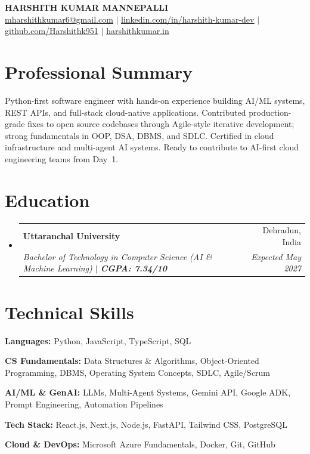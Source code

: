 \documentclass[letterpaper,10pt]{article}
\makeatletter
\newcommand{\resumeSubheading}[4]{
  \vspace{-2pt}\item
    \begin{tabular*}{0.97\textwidth}[t]{l@{\extracolsep{\fill}}r}
      \textbf{#1} & #2 \\
      \textit{\small#3} & \textit{\small #4} \\
    \end{tabular*}\vspace{-5pt}
}
\newcommand{\resumeSubHeadingListStart}{\begin{itemize}[leftmargin=0.15in, label={}]}
\newcommand{\resumeSubHeadingListEnd}{\end{itemize}}
\makeatother
\begin{document}
\begin{center}
    \textbf{\Huge \scshape HARSHITH KUMAR MANNEPALLI} \\ \vspace{3pt}
    \small
    \href{mailto:mharshithkumar6@gmail.com}{\underline{mharshithkumar6@gmail.com}} $|$
    \href{https://www.linkedin.com/in/harshith-kumar-dev/}{\underline{linkedin.com/in/harshith-kumar-dev}} $|$
    \href{https://github.com/Harshithk951}{\underline{github.com/Harshithk951}} $|$
    \href{https://harshithkumar.in}{\underline{harshithkumar.in}}
\end{center}

\section{Professional Summary}
\vspace{2pt}
\small{
Python-first software engineer with hands-on experience building AI/ML systems, REST APIs, and full-stack cloud-native applications. Contributed production-grade fixes to open source codebases through Agile-style iterative development; strong fundamentals in OOP, DSA, DBMS, and SDLC. Certified in cloud infrastructure and multi-agent AI systems. Ready to contribute to AI-first cloud engineering teams from Day~1.
}

\section{Education}
  \resumeSubHeadingListStart
    \resumeSubheading
      {Uttaranchal University}{Dehradun, India}
      {Bachelor of Technology in Computer Science (AI \& Machine Learning) $|$ \textbf{CGPA: 7.34/10}}{Expected May 2027}
  \resumeSubHeadingListEnd

\section{Technical Skills}
\vspace{-2pt}
\begin{itemize}[leftmargin=0.15in, label={}, itemsep=1pt]
\small{
  \item \textbf{Languages:} Python, JavaScript, TypeScript, SQL
  \item \textbf{CS Fundamentals:} Data Structures \& Algorithms, Object-Oriented Programming, DBMS, Operating System Concepts, SDLC, Agile/Scrum
  \item \textbf{AI/ML \& GenAI:} LLMs, Multi-Agent Systems, Gemini API, Google ADK, Prompt Engineering, Automation Pipelines
  \item \textbf{Tech Stack:} React.js, Next.js, Node.js, FastAPI, Tailwind CSS, PostgreSQL
  \item \textbf{Cloud \& DevOps:} Microsoft Azure Fundamentals, Docker, Git, GitHub
}
\end{itemize}
\end{document}
